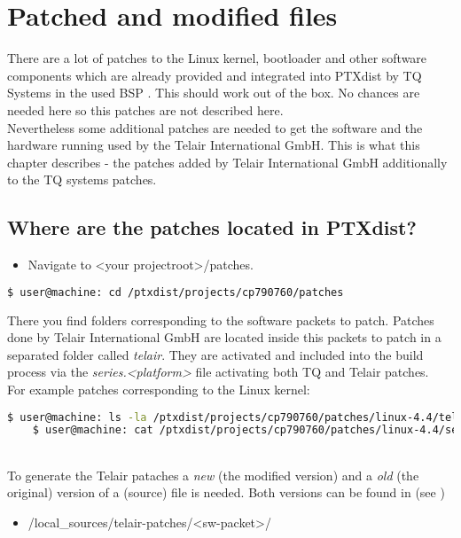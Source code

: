 \chapter{Patched and modified files}%
\label{cha:Patched and modified files}
There are a lot of patches to the Linux kernel, bootloader and other software
components which are already provided and integrated into PTXdist by TQ Systems
in the used BSP \cite{BSP_119}. This should work out of the box. No chances are
needed here so this patches are not described here.
\\
Nevertheless some additional patches are needed to get the software and the
hardware running used by the Telair International GmbH. This is what this
chapter describes - the patches added by Telair International GmbH
additionally to the TQ systems patches.


\section{Where are the patches located in PTXdist?}%
\label{sec:Where are the patches located in PTXdist}
\begin{itemize}
    \item Navigate to <your projectroot>/patches.
\end{itemize}

\begin{lstlisting}[language=bash]
    $ user@machine: cd /ptxdist/projects/cp790760/patches
\end{lstlisting}

There you find folders corresponding to the software packets to patch. Patches
done by Telair International GmbH are located inside this packets to patch in a
separated folder called \textit{telair}. They are activated and included into
the build process via the \textit{series.<platform>} file activating both TQ
and Telair patches.
\\
For example patches corresponding to the Linux kernel:
\begin{lstlisting}[language=bash]
    $ user@machine: ls -la /ptxdist/projects/cp790760/patches/linux-4.4/telair
    $ user@machine: cat /ptxdist/projects/cp790760/patches/linux-4.4/series.MBa335x
\end{lstlisting}
\\
To generate the Telair pataches a \textit{new} (the modified version)
and a \textit{old} (the original) version of a (source) file is needed. Both
versions can be found in (see )
\begin{itemize}
    \item <your projectroot>/local_sources/telair-patches/<sw-packet>/
\end{itemize}

